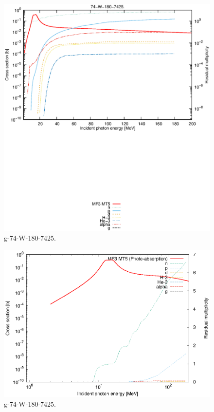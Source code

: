 \begin{figure}
 \includegraphics[width=\linewidth]{eps/g_74-W-180_7425.eps}
  \caption{g-74-W-180-7425.}
\end{figure}
\newpage \clearpage

\begin{figure}
 \includegraphics[width=\linewidth]{eps-log/g_74-W-180_7425.eps}
 \caption{g-74-W-180-7425.}
\end{figure}
\newpage \clearpage

